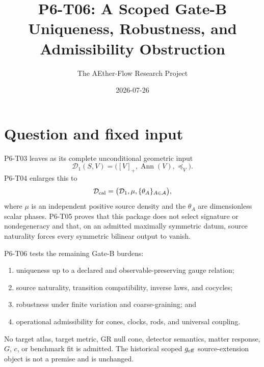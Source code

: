 \documentclass[11pt]{article}
\title{P6-T06: A Scoped Gate-B Uniqueness, Robustness, and Admissibility Obstruction}
\author{The AEther-Flow Research Project}
\date{2026-07-26}
\newcommand{\Ann}{\operatorname{Ann}}
\begin{document}
\maketitle

\begin{center}
\end{center}

\section{Question and fixed input}

P6-T03 leaves as its complete unconditional geometric input
\[
  \mathcal D_1(S,V)=\bigl([V]_+,\Ann(V),\preceq_V\bigr).
\]
P6-T04 enlarges this to
\[
  \mathcal D_{\rm cal}
  =\bigl(\mathcal D_1,\mu,\{\theta_A\}_{A\in\mathcal A}\bigr),
\]
where \(\mu\) is an independent positive source density and the
\(\theta_A\) are dimensionless scalar phases. P6-T05 proves that this package
does not select signature or nondegeneracy and that, on an admitted maximally
symmetric datum, source naturality forces every symmetric bilinear output to
vanish.

P6-T06 tests the remaining Gate-B burdens:
\begin{enumerate}
\item uniqueness up to a declared and observable-preserving gauge relation;
\item source naturality, transition compatibility, inverse laws, and cocycles;
\item robustness under finite variation and coarse-graining; and
\item operational admissibility for cones, clocks, rods, and universal
coupling.
\end{enumerate}
No target atlas, target metric, GR null cone, detector semantics, matter
response, \(G\), \(c\), or benchmark fit is admitted. The historical scoped
\(g_{\rm eff}\) source-extension object is not a premise and is unchanged.
\end{document}
